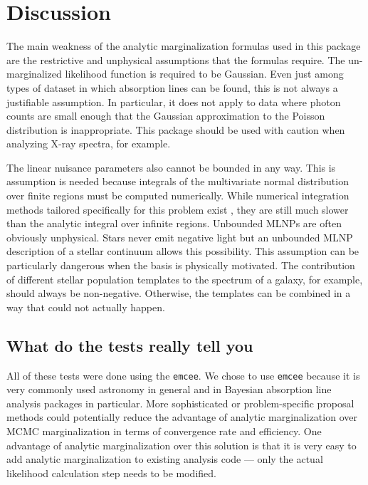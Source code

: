 \documentclass[manuscript]{aastex62}
\begin{document}
\section{Discussion}
\label{sec:discussion}
The main weakness of the analytic marginalization formulas used in this package are the restrictive and unphysical assumptions that the formulas require.
The un-marginalized likelihood function is required to be Gaussian.
Even just among types of dataset in which absorption lines can be found, this is not always a justifiable assumption.
In particular, it does not apply to data where photon counts are small enough that the Gaussian approximation to the Poisson distribution is inappropriate.
This package should be used with caution when analyzing X-ray spectra, for example.

The linear nuisance parameters also cannot be bounded in any way.
This is assumption is needed because integrals of the multivariate normal distribution over finite regions must be computed numerically.
While numerical integration methods tailored specifically for this problem exist \citep{Genz:2009jp}, they are still much slower than the analytic integral over infinite regions.
Unbounded MLNPs are often obviously unphysical.
Stars never emit negative light but an unbounded MLNP description of a stellar continuum allows this possibility.
This assumption can be particularly dangerous when the basis is physically motivated.
The contribution of different stellar population templates to the spectrum of a galaxy, for example, should always be non-negative.
Otherwise, the templates can be combined in a way that could not actually happen.

\subsection{What do the tests really tell you}

All of these tests were done using the \texttt{emcee}.
We chose to use \texttt{emcee} because it is very commonly used astronomy in general and in Bayesian absorption line analysis packages in particular.
More sophisticated or problem-specific proposal methods could potentially reduce the advantage of analytic marginalization over MCMC marginalization in terms of convergence rate and efficiency.
One advantage of analytic marginalization over this solution is that it is very easy to add analytic marginalization to existing analysis code --- only the actual likelihood calculation step needs to be modified.
\end{document}

